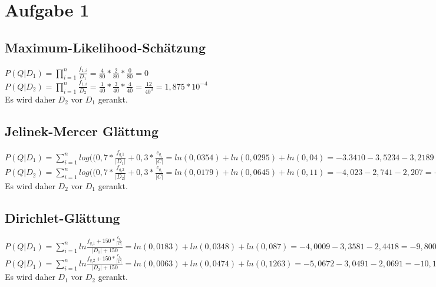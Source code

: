 \section*{Aufgabe 1}

\subsection*{Maximum-Likelihood-Schätzung}

$P(Q|D_{1}) = \prod_{i=1}^{n} \frac{f_{1,i}}{D_{1}} = \frac{4}{80} * \frac{2}{80} * \frac{0}{80} = 0$ \\
$P(Q|D_{2}) = \prod_{i=1}^{n} \frac{f_{1,i}}{D_{2}} = \frac{1}{40} * \frac{3}{40} * \frac{4}{40} = \frac{12}{40^{3}} = 1,875 * 10^{-4}$ \\

Es wird daher $D_{2}$ vor $D_{1}$ gerankt.

\subsection*{Jelinek-Mercer Glättung}

$P(Q|D_{1}) = \sum_{i=1}^{n} log((0,7 * \frac{f_{q_{i}1}}{|D_{1}|} + 0,3 * \frac{c_{q_{i}}}{|C|} = ln (0,0354) + ln (0,0295) + ln (0,04) = -3.3410 - 3,5234 - 3,2189 = -10,0833$\\

$P(Q|D_{2}) = \sum_{i=1}^{n} log((0,7 * \frac{f_{q_{i}2}}{|D_{2}|} + 0,3 * \frac{c_{q_{i}}}{|C|} = 
ln(0,0179) + ln(0,0645) + ln(0,11) = -4,023 -2,741 -2,207 = -8,834$\\

Es wird daher $D_{2}$ vor $D_{1}$ gerankt.

\subsection*{Dirichlet-Glättung}

$P(Q|D_{1}) =  \sum_{i=1}^{n} ln \frac{f_{q_{i}1} + 150 * \frac{c_{q_{i}}}{|C|}}{|D_{1}| + 150} = 
ln(0,0183) + ln(0,0348) + ln(0,087) = -4,0009 -3,3581 -2,4418 = -9,8008$\\

$P(Q|D_{1}) =  \sum_{i=1}^{n} ln \frac{f_{q_{i}2} + 150 * \frac{c_{q_{i}}}{|C|}}{|D_{2}| + 150} =
ln(0,0063) + ln(0,0474) + ln(0,1263) = -5,0672 - 3,0491 - 2,0691 = - 10,1854$\\

Es wird daher $D_{1}$ vor $D_{2}$ gerankt.